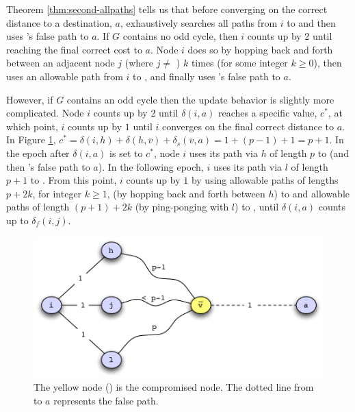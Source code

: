 {{Theorem \ref{thm:second-allpaths} tells us that before converging on the correct distance to a destination, $a$, \second exhaustively searches all paths from $i$ to \bad and then uses \bad's
false path to $a$.  If $G$ contains no odd cycle, then $i$ counts up by $2$ until reaching the final correct cost to $a$. Node $i$ does so by hopping back and forth between an adjacent node $j$ 
(where $j \neq$ \bads) $k$ times (for some integer $k \geq 0$), then uses an allowable path from $i$ to \bads, and finally uses \bad's false path to $a$.

However, if $G$ contains an odd cycle then the update behavior is slightly more complicated.  Node $i$ counts up by $2$ until $\delta(i,a)$ reaches a specific value, $c^*$, at which point, $i$ counts 
up by $1$ until $i$ converges on the final correct distance to $a$.  In Figure \ref{fig:second-odd}, $c^* = \delta(i,h) + \delta(h,\overline{v}) + \delta_s(\overline{v},a) = 1 + (p-1)+1 = p+1$.
In the epoch after $\delta(i,a)$ is set to $c^*$, node $i$ uses its path via $h$ of length $p$ to \bad (and then \bads's false path to $a$).
In the following epoch, $i$ uses its path via $l$ of length $p+1$ to \bads.  
From this point, $i$ counts up by $1$ by using allowable paths of lengths $p+2k$, for integer $k \geq 1$, (by hopping back and forth between $h$) to \bad and allowable paths of length $(p+1)+2k$ 
(by ping-ponging with $l$) to \bads, until $\delta(i,a)$ counts up to $\delta_f(i,j)$.



\begin{figure}[t]
\centering
\includegraphics[scale=.57]{figs/second-odd.pdf}
\caption{The yellow node (\bads) is the compromised node.  The dotted line from \bad to $a$ represents the false path. }
\label{fig:second-odd}
\end{figure}

}}
